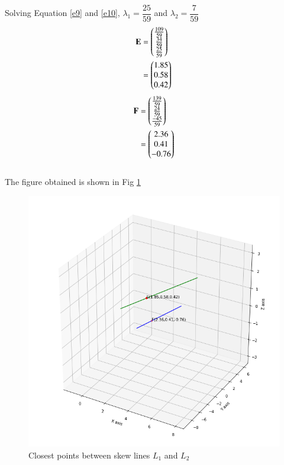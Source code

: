 \documentclass[journal,12pt,twocolumn]{IEEEtran}
\begin{document}
Solving Equation \ref{e9} and \ref{e10}, $\lambda_1 = \dfrac{25}{59}$ and $\lambda_2 = \dfrac{7}{59}$\\
\begin{align}
    \mathbf{E} & = \begin{pmatrix}\frac{109}{59} \\ \frac{34}{59}
    \\ \frac{25}{59}\end{pmatrix}
    \\&=\begin{pmatrix}1.85 \\ 0.58 \\ 0.42\end{pmatrix}
\end{align}
\begin{align}
    \mathbf{F} & = \begin{pmatrix}\frac{139}{59} \\ \frac{24}{59}
    \\ \frac{-45}{59}\end{pmatrix}
    \\&=\begin{pmatrix}2.36 \\ 0.41 \\ -0.76\end{pmatrix}
\end{align}
\\
The figure obtained is shown in Fig \ref{myfig}
\renewcommand{\thefigure}{1}
\begin{figure}[h!]
    \centering
    \includegraphics[width=\columnwidth]{closest.png}
    \caption{Closest points between skew lines $L_1$ and $L_2$}
    \label{myfig}
\end{figure}
\end{document}
